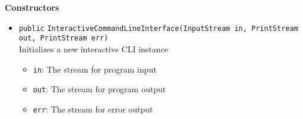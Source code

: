 \textbf{Constructors}
\begin{itemize}
\item \lstinline|public| \lstinline|InteractiveCommandLineInterface|\lstinline|(InputStream in, PrintStream out, PrintStream err)|\\
Initializes a new interactive CLI instance
\begin{itemize}
\item \lstinline|in|: The stream for program input
\item \lstinline|out|: The stream for program output
\item \lstinline|err|: The stream for error output
\end{itemize}



\end{itemize}


